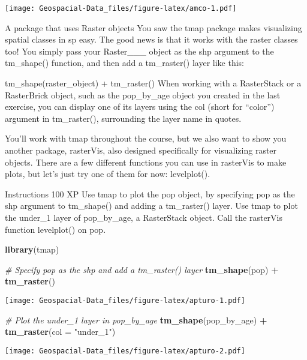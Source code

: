 \documentclass[]{article}
\newenvironment{Shaded}{\begin{snugshade}}{\end{snugshade}}
\newcommand{\CommentTok}[1]{\textcolor[rgb]{0.56,0.35,0.01}{\textit{#1}}}
\newcommand{\DataTypeTok}[1]{\textcolor[rgb]{0.13,0.29,0.53}{#1}}
\newcommand{\KeywordTok}[1]{\textcolor[rgb]{0.13,0.29,0.53}{\textbf{#1}}}
\newcommand{\NormalTok}[1]{#1}
\newcommand{\OperatorTok}[1]{\textcolor[rgb]{0.81,0.36,0.00}{\textbf{#1}}}
\newcommand{\StringTok}[1]{\textcolor[rgb]{0.31,0.60,0.02}{#1}}
\begin{document}
\texttt{[image: Geospacial-Data\_files/figure-latex/amco-1.pdf]}

A package that uses Raster objects You saw the tmap package makes
visualizing spatial classes in sp easy. The good news is that it works
with the raster classes too! You simply pass your Raster\_\_\_ object as
the shp argument to the tm\_shape() function, and then add a
tm\_raster() layer like this:

tm\_shape(raster\_object) + tm\_raster() When working with a RasterStack
or a RasterBrick object, such as the pop\_by\_age object you created in
the last exercise, you can display one of its layers using the col
(short for ``color'') argument in tm\_raster(), surrounding the layer
name in quotes.

You'll work with tmap throughout the course, but we also want to show
you another package, rasterVis, also designed specifically for
visualizing raster objects. There are a few different functions you can
use in rasterVis to make plots, but let's just try one of them for now:
levelplot().

Instructions 100 XP Use tmap to plot the pop object, by specifying pop
as the shp argument to tm\_shape() and adding a tm\_raster() layer. Use
tmap to plot the under\_1 layer of pop\_by\_age, a RasterStack object.
Call the rasterVis function levelplot() on pop.

\begin{Shaded}
\begin{Highlighting}[]
\KeywordTok{library}\NormalTok{(tmap)}

\CommentTok{# Specify pop as the shp and add a tm_raster() layer}
\KeywordTok{tm_shape}\NormalTok{(pop) }\OperatorTok{+}
\StringTok{  }\KeywordTok{tm_raster}\NormalTok{()}
\end{Highlighting}
\end{Shaded}

\texttt{[image: Geospacial-Data\_files/figure-latex/apturo-1.pdf]}

\begin{Shaded}
\begin{Highlighting}[]
\CommentTok{# Plot the under_1 layer in pop_by_age}
\KeywordTok{tm_shape}\NormalTok{(pop_by_age) }\OperatorTok{+}
\StringTok{  }\KeywordTok{tm_raster}\NormalTok{(}\DataTypeTok{col =} \StringTok{"under_1"}\NormalTok{)}
\end{Highlighting}
\end{Shaded}

\texttt{[image: Geospacial-Data\_files/figure-latex/apturo-2.pdf]}
\end{document}
